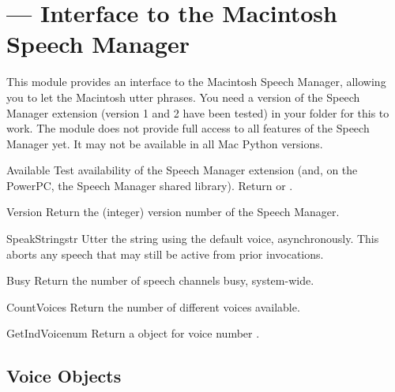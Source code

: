 \section{ ---
         Interface to the Macintosh Speech Manager}



This module provides an interface to the Macintosh Speech Manager,
allowing you to let the Macintosh utter phrases. You need a version of
the Speech Manager extension (version 1 and 2 have been tested) in
your  folder for this to work. The module does not
provide full access to all features of the Speech Manager yet.  It may
not be available in all Mac Python versions.

\begin{funcdesc}{Available}{}
Test availability of the Speech Manager extension (and, on the
PowerPC, the Speech Manager shared library). Return  or
.
\end{funcdesc}

\begin{funcdesc}{Version}{}
Return the (integer) version number of the Speech Manager.
\end{funcdesc}

\begin{funcdesc}{SpeakString}{str}
Utter the string  using the default voice,
asynchronously. This aborts any speech that may still be active from
prior  invocations.
\end{funcdesc}

\begin{funcdesc}{Busy}{}
Return the number of speech channels busy, system-wide.
\end{funcdesc}

\begin{funcdesc}{CountVoices}{}
Return the number of different voices available.
\end{funcdesc}

\begin{funcdesc}{GetIndVoice}{num}
Return a  object for voice number .
\end{funcdesc}

\subsection{Voice Objects}
\label{voice-objects}


